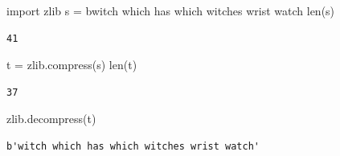 \documentclass[
  spanish,
  letterpaper,
]{scrbook}
\newenvironment{Shaded}{\begin{snugshade}}{\end{snugshade}}
\newcommand{\BuiltInTok}[1]{\textcolor[rgb]{0.00,0.23,0.31}{#1}}
\newcommand{\ImportTok}[1]{\textcolor[rgb]{0.00,0.46,0.62}{#1}}
\newcommand{\NormalTok}[1]{\textcolor[rgb]{0.00,0.23,0.31}{#1}}
\newcommand{\OperatorTok}[1]{\textcolor[rgb]{0.37,0.37,0.37}{#1}}
\newcommand{\StringTok}[1]{\textcolor[rgb]{0.13,0.47,0.30}{#1}}
\theoremstyle{definition}
\theoremstyle{remark}
\begin{document}
\begin{Shaded}
\begin{Highlighting}[]
\ImportTok{import}\NormalTok{ zlib}
\NormalTok{s }\OperatorTok{=} \StringTok{b\textquotesingle{}witch which has which witches wrist watch\textquotesingle{}}
\BuiltInTok{len}\NormalTok{(s)}
\end{Highlighting}
\end{Shaded}

\begin{verbatim}
41
\end{verbatim}

\begin{Shaded}
\begin{Highlighting}[]
\NormalTok{t }\OperatorTok{=}\NormalTok{ zlib.compress(s)}
\BuiltInTok{len}\NormalTok{(t)}
\end{Highlighting}
\end{Shaded}

\begin{verbatim}
37
\end{verbatim}

\begin{Shaded}
\begin{Highlighting}[]
\NormalTok{zlib.decompress(t)}
\end{Highlighting}
\end{Shaded}

\begin{verbatim}
b'witch which has which witches wrist watch'
\end{verbatim}
\end{document}
